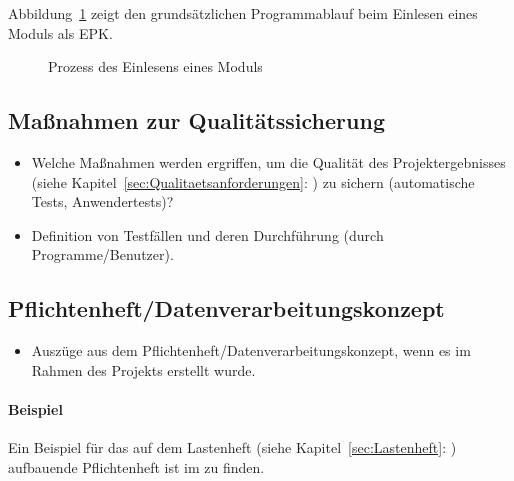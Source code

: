 Abbildung~\ref{fig:Modulimport} zeigt den grundsätzlichen Programmablauf beim Einlesen eines Moduls als \ac{EPK}.
\begin{figure}[htb]
\centering
{}
\caption{Prozess des Einlesens eines Moduls}
\label{fig:Modulimport}
\end{figure}


\subsection{Maßnahmen zur Qualitätssicherung}
\label{sec:Qualitaetssicherung}
\begin{itemize}
	\item Welche Maßnahmen werden ergriffen, um die Qualität des Projektergebnisses (siehe Kapitel~\ref{sec:Qualitaetsanforderungen}: ) zu sichern (\zB automatische Tests, Anwendertests)?
	\item \Ggfs Definition von Testfällen und deren Durchführung (durch Programme/Benutzer).
\end{itemize}


\subsection{Pflichtenheft/Datenverarbeitungskonzept}
\label{sec:Pflichtenheft}
\begin{itemize}
	\item Auszüge aus dem Pflichtenheft/Datenverarbeitungskonzept, wenn es im Rahmen des Projekts erstellt wurde.
\end{itemize}

\paragraph{Beispiel}
Ein Beispiel für das auf dem Lastenheft (siehe Kapitel~\ref{sec:Lastenheft}: ) aufbauende Pflichtenheft ist im  zu finden.


